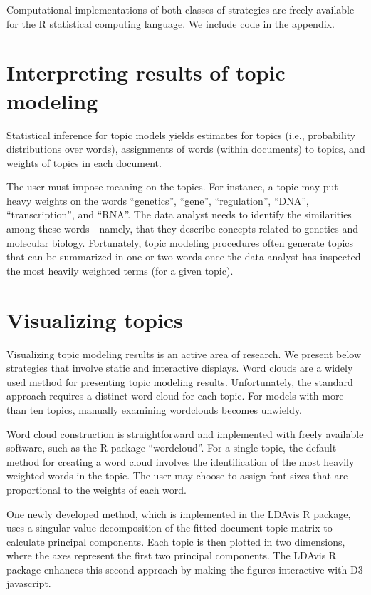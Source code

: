 \documentclass[12pt,]{article}
\begin{document}
Computational implementations of both classes of strategies are freely
available for the R statistical computing language. We include code in
the appendix.

\section{Interpreting results of topic
modeling}\label{interpreting-results-of-topic-modeling}

Statistical inference for topic models yields estimates for topics
(i.e., probability distributions over words), assignments of words
(within documents) to topics, and weights of topics in each document.

The user must impose meaning on the topics. For instance, a topic may
put heavy weights on the words ``genetics'', ``gene'', ``regulation'',
``DNA'', ``transcription'', and ``RNA''. The data analyst needs to
identify the similarities among these words - namely, that they describe
concepts related to genetics and molecular biology. Fortunately, topic
modeling procedures often generate topics that can be summarized in one
or two words once the data analyst has inspected the most heavily
weighted terms (for a given topic).

\section{Visualizing topics}\label{visualizing-topics}

Visualizing topic modeling results is an active area of research. We
present below strategies that involve static and interactive displays.
Word clouds are a widely used method for presenting topic modeling
results. Unfortunately, the standard approach requires a distinct word
cloud for each topic. For models with more than ten topics, manually
examining wordclouds becomes unwieldy.

Word cloud construction is straightforward and implemented with freely
available software, such as the R package ``wordcloud''. For a single
topic, the default method for creating a word cloud involves the
identification of the most heavily weighted words in the topic. The user
may choose to assign font sizes that are proportional to the weights of
each word.

One newly developed method, which is implemented in the LDAvis R
package, uses a singular value decomposition of the fitted
document-topic matrix to calculate principal components. Each topic is
then plotted in two dimensions, where the axes represent the first two
principal components. The LDAvis R package enhances this second approach
by making the figures interactive with D3 javascript.
\end{document}
